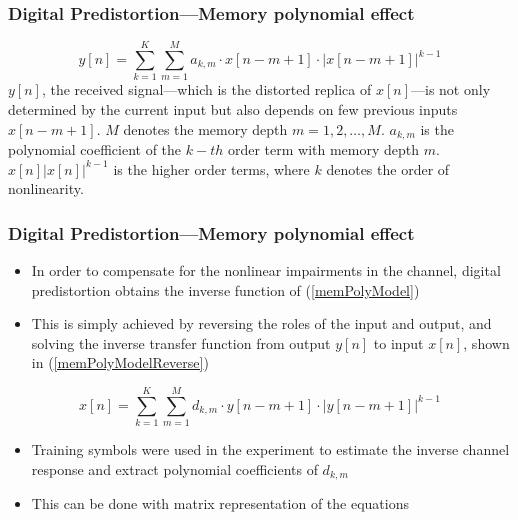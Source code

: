 \documentclass[t]{beamer}
\begin{document}
\begin{frame}
    \frametitle{Digital Predistortion---Memory polynomial effect}
    \begin{equation}
         y\left[n\right] = \sum_{k=1}^{K}\sum_{m=1}^{M}a_{k,m}\cdot x\left[n-m+1\right]\cdot |x\left[n-m+1\right]|^{k-1} 
        \label{memPolyModel}
    \end{equation}
    \(y\left[n\right]\), the received signal---which is the distorted replica of 
    \(x\left[n\right]\)---is not only determined by the current input but also depends on few previous inputs \(x\left[n-m+1\right]\).
    \(M\) denotes the memory depth \(m=1,2,\ldots,M\).
    \(a_{k,m}\) is the polynomial coefficient of the \(k-th\) order term with memory depth \(m\).
    \(x\left[n\right]|x\left[n\right]|^{k-1}\) is the higher order terms, where \(k\) denotes the order of nonlinearity.

\end{frame}

\begin{frame}
    \frametitle{Digital Predistortion---Memory polynomial effect}
    \begin{itemize}
        \item In order to compensate for the nonlinear impairments in the channel, digital predistortion obtains the inverse function of (\ref{memPolyModel})
        \item This is simply achieved by reversing the roles of the input and output, and solving the inverse transfer function from output \(y\left[n\right]\) to input \(x\left[n\right]\), shown in (\ref{memPolyModelReverse})
        
    \end{itemize}
    \begin{equation}
        x\left[n\right] = \sum_{k=1}^{K}\sum_{m=1}^{M}d_{k,m}\cdot y\left[n-m+1\right]\cdot |y\left[n-m+1\right]|^{k-1} 
       \label{memPolyModelReverse}
    \end{equation}

    \begin{itemize}
        \item Training symbols were used in the experiment to estimate the inverse channel response and extract polynomial coefficients of \(d_{k,m}\)
        \item This can be done with matrix representation of the equations
    \end{itemize}


\end{frame}
\end{document}
